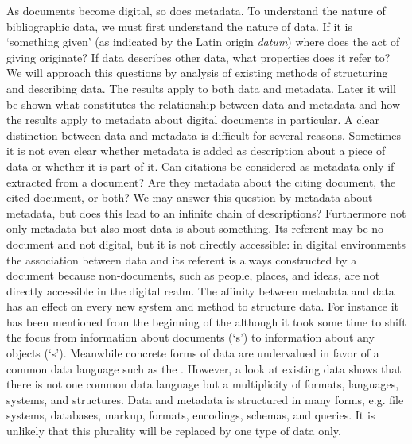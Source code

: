 As documents become digital, so does metadata. To understand the nature of
bibliographic data, we must first understand the nature of data. If it is
`something given' (as indicated by the Latin origin \emph{datum}) where
does the act of giving originate? If data describes other data, what properties
does it refer to? We will approach this questions by analysis of existing
methods of structuring and describing data. The results apply to both data and
metadata.  Later it will be shown what constitutes the relationship between
data and metadata and how the results apply to metadata about digital documents
in particular. A clear distinction between data and metadata is difficult for
several reasons. Sometimes it is not even clear whether metadata is added as
description about a piece of data or whether it is part of it. Can citations be
considered as metadata only if extracted from a document? Are they metadata
about the citing document, the cited document, or both? We may answer this
question by metadata about metadata, but does this lead to an infinite chain of
descriptions?  Furthermore not only metadata but also most data is about
something. Its referent may be no document and not digital, but it is not
directly accessible: in digital environments the association between data and
its referent is always constructed by a document because non-documents, such as
people, places, and ideas, are not directly accessible in the digital realm.
The affinity between metadata and data has an effect on every new system and
method to structure data. For instance it has been mentioned from the beginning
of the  \cite{TBL1997,Guha1997,Lassila1999} although it took
some time to shift the focus from information about documents
(`s') to information about any objects
(`s'). Meanwhile concrete forms of data are
undervalued in favor of a common data language such as the . However, a look at existing data shows that there
is not one common data language but a multiplicity of formats, languages,
systems, and structures. Data and metadata is structured in many forms, e.g.
file systems, databases, markup, formats, encodings, schemas, and queries. It
is unlikely that this plurality will be replaced by one type of data only.

